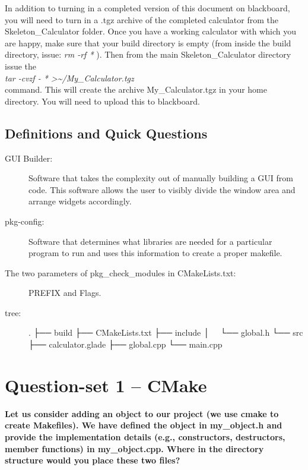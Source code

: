 \documentclass{article}
\begin{document}
In addition to turning in a completed version of this document on blackboard, you will need to turn in a .tgz archive of the completed calculator from the Skeleton\_Calculator folder. Once you have a working calculator with which you are happy, make sure that your build directory is empty (from inside the build directory, issue: \textit{rm -rf * }). Then from the main Skeleton\_Calculator directory issue the\\ \textit{tar -cvzf - * \textgreater\textasciitilde/My\_Calculator.tgz} \\
command. This will create the archive My\_Calculator.tgz in your home directory. You will need to upload this to blackboard.

\subsection{Definitions and Quick Questions}
\label{definitions}
\begin{description}
\item[GUI Builder:]
Software that takes the complexity out of manually building a GUI from code. This software allows the user to visibly divide the window area and arrange widgets accordingly.   
\item[pkg-config:]
Software that determines what libraries are needed for a particular program to run and uses this information to create a proper makefile.
\item[The two parameters of pkg\_check\_modules in CMakeLists.txt:]
PREFIX and Flags.
\item[tree:]
.
├── build
├── CMakeLists.txt
├── include
│   └── global.h
└── src
    ├── calculator.glade
    ├── global.cpp
    └── main.cpp

\item[]
\end{description} 

\section{Question-set 1 -- CMake}
\textbf{Let us consider adding an object to our project (we use cmake to create Makefiles). We have defined the object in my\_object.h and provide the implementation details (e.g., constructors, destructors, member functions) in my\_object.cpp. Where in the directory structure would you place these two files? }\\
\end{document}

